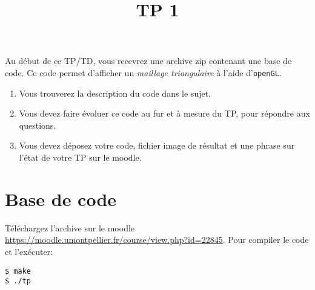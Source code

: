 \documentclass[a4paper,10pt]{tp_um}
\title{\Large \sffamily\bfseries TP 1}
\newcommand\code[1]{\texttt{#1}}
\begin{document}
\maketitle

\bigskip
\bigskip
\bigskip

Au d\'ebut de ce TP/TD, vous recevrez une archive zip contenant une base de code.
Ce code permet d'afficher un \emph{maillage triangulaire} \`a l'aide d'\texttt{openGL}.
\begin{enumerate}
 \item Vous trouverez la description du code dans le sujet.
 \item Vous devez faire \'evoluer ce code au fur et \`a mesure du TP, pour r\'epondre aux questions.
 \item Vous devez déposez votre code, fichier image de résultat et une phrase sur l'état de votre TP sur le moodle.
\end{enumerate}


\section{Base de code}

T\'el\'echargez l'archive sur le moodle \url{https://moodle.umontpellier.fr/course/view.php?id=22845}. Pour compiler le code et l'exécuter: 
\begin{verbatim}
$ make
$ ./tp
\end{verbatim}

% 
% 
% 
% 
% 
\end{document}
